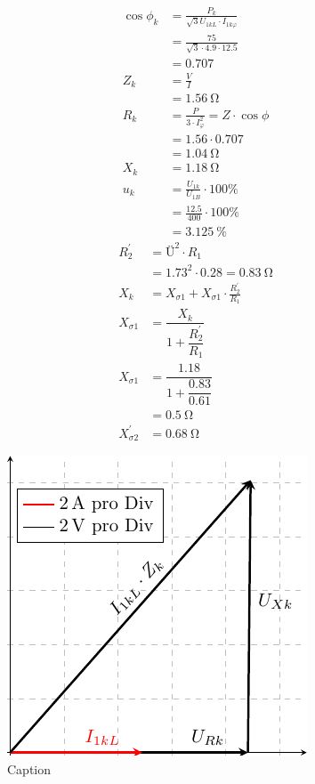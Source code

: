 \begin{align*}
\cos \phi_k &= \frac{P_k}{\sqrt{3}U_{1kL} \cdot I_{1k\varphi}}\\
&= \frac{75}{\sqrt{3}\cdot 4.9 \cdot 12.5} \\
&= 0.707\\
    Z_k &= \frac{V}{I}\\
    & = \SI{1.56}{\ohm}\\
    R_{k} &= \frac{P}{3 \cdot I_{\varphi}^2} = Z \cdot \cos \phi\\
    &=1.56 \cdot 0.707 \\
    &= \SI{1.04}{\ohm}\\
   X_k &= \SI{1.18}{\ohm}\\
    u_k &= \frac{U_{1k}}{U_{1B}}\cdot 100 \% \\
    &= \frac{12.5}{400}\cdot 100 \% \\
    & = \SI{3.125}{\percent}
\end{align*}
\begin{align*}
    R^\prime_2 &= \text{Ü}^2 \cdot R_1\\
    &= 1.73^2 \cdot 0.28 = \SI{0.83}{\ohm} \\ 
    X_k &= X_{\sigma 1} +   X_{\sigma 1} \cdot \frac{ R^\prime_2 }{R_1}\\
    X_{\sigma 1} &= \dfrac{X_k}{1+\dfrac{ R^\prime_2 }{R_1}}\\
     X_{\sigma 1} &= \dfrac{1.18}{1+\dfrac{0.83}{0.61}}\\
     &= \SI{0.5}{\ohm}\\
      X^\prime_{\sigma 2} &= \SI{0.68}{\ohm}
\end{align*}

\begin{figure}[H]
    \centering
    \includegraphics{fig/phasor_short.pdf}
    \caption{Caption}
    \label{fig:open}
\end{figure}